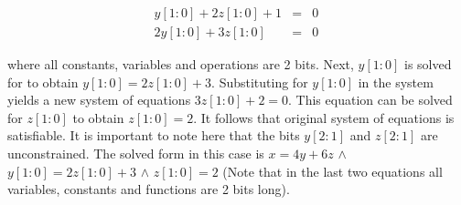 \begin{eqnarray}
 y[1:0] + 2z[1:0] + 1 &=& 0 \nonumber\\
2y[1:0] + 3z[1:0] &=& 0 \nonumber\
\end{eqnarray}

where all constants, variables and operations are 2 bits.  Next,
$y[1:0]$ is solved for to obtain $y[1:0] = 2z[1:0] + 3$. Substituting
for $y[1:0]$ in the system yields a new system of equations $3z[1:0] +
2 = 0$. This equation can be solved for $z[1:0]$ to obtain $z[1:0] =
2$. It follows that original system of equations is satisfiable. It is
important to note here that the bits $y[2:1]$ and $z[2:1]$ are
unconstrained. The solved form in this case is $x=4y+6z$ $\wedge$
$y[1:0] = 2z[1:0] + 3$ $\wedge$ $z[1:0] = 2$ (Note that in the last
two equations all variables, constants and functions are 2 bits long).






